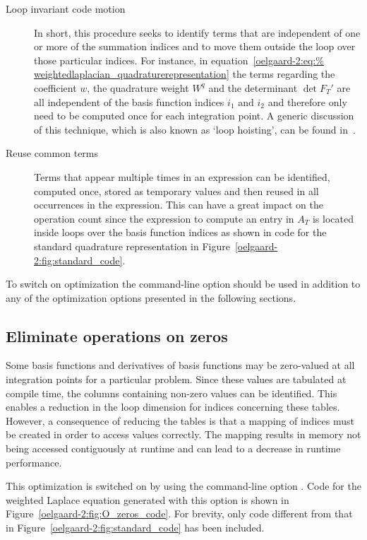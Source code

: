 \begin{description}
\item[Loop invariant code motion] In short, this procedure seeks to
identify terms that are independent of one or more of the summation
indices and to move them outside the loop over those particular
indices.  For instance, in equation~\eqref{oelgaard-2:eq:%
weightedlaplacian_quadraturerepresentation} the terms regarding the
coefficient $w$, the quadrature weight $W^q$ and the determinant $\det
F_T'$ are all independent of the basis function indices $i_1$ and
$i_2$ and therefore only need to be computed once for each integration
point.  A generic discussion of this technique, which is also known as
`loop hoisting', can be found
in~\citet{AhoSethiUllman1986}.

\item[Reuse common terms] Terms that appear multiple times in an
  expression can be identified, computed once, stored as temporary
  values and then reused in all occurrences in the expression.  This can
  have a great impact on the operation count since the expression to
  compute an entry in $A_T$ is located inside loops over the basis
  function indices as shown in code for the standard quadrature
  representation in Figure~\ref{oelgaard-2:fig:standard_code}.
\end{description}

To switch on optimization the command-line option  should be
used in addition to any of the \ffc{} optimization options presented
in the following sections.

\subsection{Eliminate operations on zeros}
\label{oelgaard-2:sec:eliminate_zeros}

Some basis functions and derivatives of basis functions may be
zero-valued at all integration points for a particular problem.  Since
these values are tabulated at compile time, the columns containing
non-zero values can be identified.  This enables a reduction in the
loop dimension for indices concerning these tables.  However, a
consequence of reducing the tables is that a mapping of indices must
be created in order to access values correctly.  The mapping results
in memory not being accessed contiguously at runtime and can lead to a
decrease in runtime performance.

This optimization is switched on by using the command-line option
. Code for the weighted Laplace equation
generated with this option is shown in
Figure~\ref{oelgaard-2:fig:O_zeros_code}. For brevity, only code
different from that in Figure~\ref{oelgaard-2:fig:standard_code} has
been included.

